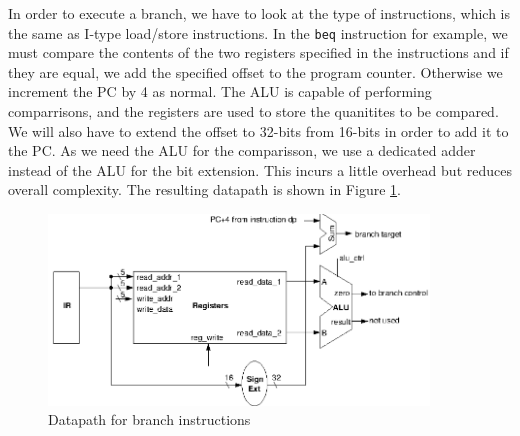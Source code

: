 \documentclass{article}
\begin{document}
	\par 
	In order to execute a branch, we have to look at the type of instructions, which is the same as I-type load/store instructions. In the \texttt{beq} instruction for example, we must compare the contents of the two registers specified in the instructions and if they are equal, we add the specified offset to the program counter. Otherwise we increment the PC by 4 as normal. The ALU is capable of performing comparrisons, and the registers are used to store the quanitites to be compared. We will also have to extend the offset to 32-bits from 16-bits in order to add it to the PC. As we need the ALU for the comparisson, we use a dedicated adder instead of the ALU for the bit extension. This incurs a little overhead but reduces overall complexity. The resulting datapath is shown in Figure \ref{fig:branch jump datapath}.
	
	\begin{figure}
		\centering
		\includegraphics[width=0.9\textwidth]{branch_jump_datapath}
		\caption{Datapath for branch instructions}
		\label{fig:branch jump datapath}
	\end{figure}			
	
\end{document}
